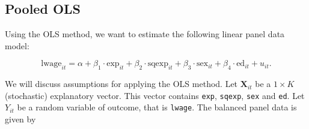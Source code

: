 \documentclass[
  12pt,
]{article}
\begin{document}
\hypertarget{pooled-ols}{%
\subsection{Pooled OLS}\label{pooled-ols}}

Using the OLS method, we want to estimate the following linear panel
data model:

\[
  \text{lwage}_{it} = 
  \alpha + \beta_1 \cdot \text{exp}_{it} +
  \beta_2 \cdot \text{sqexp}_{it} +
  \beta_3 \cdot \text{sex}_{it} + 
  \beta_4 \cdot \text{ed}_{it} + u_{it}.
\]

We will discuss assumptions for applying the OLS method. Let
\(\mathbf{X}_{it}\) be a \(1 \times K\) (stochastic) explanatory vector.
This vector contains \texttt{exp}, \texttt{sqexp}, \texttt{sex} and
\texttt{ed}. Let \(Y_{it}\) be a random variable of outcome, that is
\texttt{lwage}. The balanced panel data is given by
\end{document}
